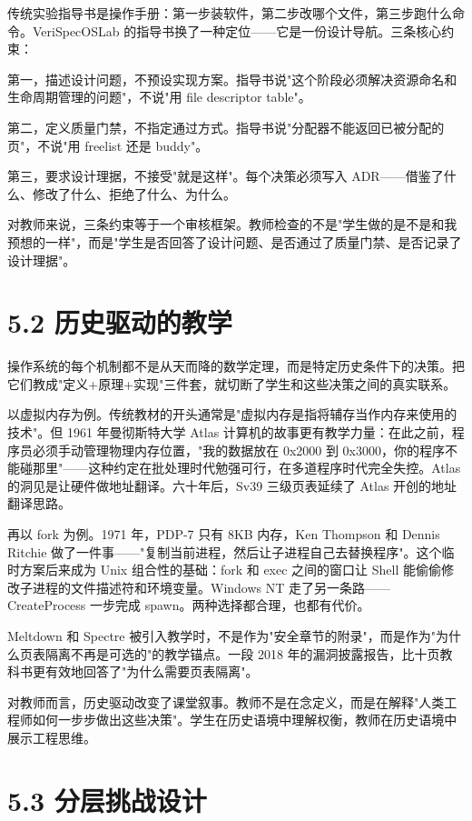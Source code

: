 \documentclass[UTF8,a4paper,12pt,openany]{ctexrep}
\begin{document}
传统实验指导书是操作手册：第一步装软件，第二步改哪个文件，第三步跑什么命令。VeriSpecOSLab 的指导书换了一种定位------它是一份设计导航。三条核心约束：

第一，描述设计问题，不预设实现方案。指导书说"这个阶段必须解决资源命名和生命周期管理的问题"，不说"用 file descriptor table"。

第二，定义质量门禁，不指定通过方式。指导书说"分配器不能返回已被分配的页"，不说"用 freelist 还是 buddy"。

第三，要求设计理据，不接受"就是这样"。每个决策必须写入 ADR------借鉴了什么、修改了什么、拒绝了什么、为什么。

对教师来说，三条约束等于一个审核框架。教师检查的不是"学生做的是不是和我预想的一样"，而是"学生是否回答了设计问题、是否通过了质量门禁、是否记录了设计理据"。

\section{5.2 历史驱动的教学}\label{52-ux5386ux53f2ux9a71ux52a8ux7684ux6559ux5b66}

操作系统的每个机制都不是从天而降的数学定理，而是特定历史条件下的决策。把它们教成"定义+原理+实现"三件套，就切断了学生和这些决策之间的真实联系。

以虚拟内存为例。传统教材的开头通常是"虚拟内存是指将辅存当作内存来使用的技术"。但 1961 年曼彻斯特大学 Atlas 计算机的故事更有教学力量：在此之前，程序员必须手动管理物理内存位置，"我的数据放在 0x2000 到 0x3000，你的程序不能碰那里"------这种约定在批处理时代勉强可行，在多道程序时代完全失控。Atlas 的洞见是让硬件做地址翻译。六十年后，Sv39 三级页表延续了 Atlas 开创的地址翻译思路。

再以 fork 为例。1971 年，PDP-7 只有 8KB 内存，Ken Thompson 和 Dennis Ritchie 做了一件事------"复制当前进程，然后让子进程自己去替换程序"。这个临时方案后来成为 Unix 组合性的基础：fork 和 exec 之间的窗口让 Shell 能偷偷修改子进程的文件描述符和环境变量。Windows NT 走了另一条路------CreateProcess 一步完成 spawn。两种选择都合理，也都有代价。

Meltdown 和 Spectre 被引入教学时，不是作为"安全章节的附录"，而是作为"为什么页表隔离不再是可选的"的教学锚点。一段 2018 年的漏洞披露报告，比十页教科书更有效地回答了"为什么需要页表隔离"。

对教师而言，历史驱动改变了课堂叙事。教师不是在念定义，而是在解释"人类工程师如何一步步做出这些决策"。学生在历史语境中理解权衡，教师在历史语境中展示工程思维。

\section{5.3 分层挑战设计}\label{53-ux5206ux5c42ux6311ux6218ux8bbeux8ba1}
\end{document}

